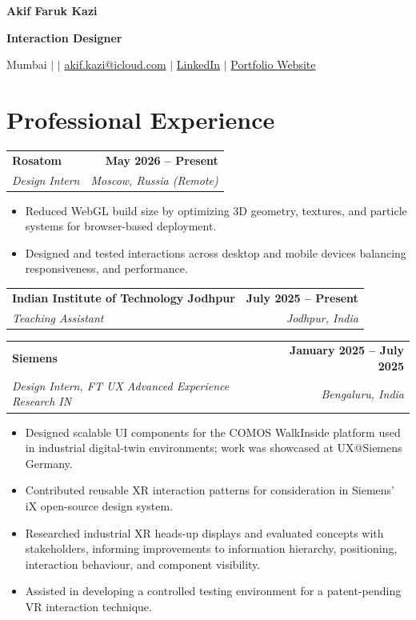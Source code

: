\documentclass[a4paper,10.5pt]{article}
\makeatletter
\newcommand{\resumeEntry}[4]{
    \begin{tabularx}{\textwidth}{@{}X r@{}}
        \textbf{\color{headingcolor}#1} & \textbf{#4} \\
        \textit{#3} & \textit{#2}
    \end{tabularx}
    \vspace{1pt}
}
\newcommand{\resumeListStart}{
    \begin{itemize}
}
\newcommand{\resumeListEnd}{
    \end{itemize}
    \vspace{3pt}
}
\makeatother
\begin{document}
\begin{center}
    {\LARGE\bfseries\color{headingcolor} Akif Faruk Kazi}

    \vspace{3pt}

    \textbf{Interaction Designer}

    \vspace{5pt}

    Mumbai
    \enspace $\vert$ 
    \enspace $\vert$ \enspace
    \href{mailto:akif.kazi@icloud.com}{akif.kazi@icloud.com}
    \enspace $\vert$ \enspace
    \href{https://www.linkedin.com/in/akif-faruk-kazi/}{LinkedIn}
    \enspace $\vert$ \enspace
    \href{https://akifkazi.notion.site/portfolio}{Portfolio Website}
\end{center}

\section{Professional Experience}

\resumeEntry
    {Rosatom}
    {Moscow, Russia (Remote)}
    {Design Intern}
    {May 2026 -- Present}

\resumeListStart
    \item Reduced WebGL build size by optimizing 3D geometry, textures, and particle systems for browser-based deployment.
    \item Designed and tested interactions across desktop and mobile devices balancing responsiveness, and performance.
\resumeListEnd

\resumeEntry
    {Indian Institute of Technology Jodhpur}
    {Jodhpur, India}
    {Teaching Assistant}
    {July 2025 -- Present}

\resumeListStart
\resumeListEnd

\resumeEntry
    {Siemens}
    {Bengaluru, India}
    {Design Intern, FT UX Advanced Experience Research IN}
    {January 2025 -- July 2025}

\resumeListStart
    \item Designed scalable UI components for the COMOS WalkInside platform used in industrial digital-twin environments; work was showcased at UX@Siemens Germany.
    \item Contributed reusable XR interaction patterns for consideration in Siemens' iX open-source design system.
    \item Researched industrial XR heads-up displays and evaluated concepts with stakeholders, informing improvements to information hierarchy, positioning, interaction behaviour, and component visibility.
    \item Assisted in developing a controlled testing environment for a patent-pending VR interaction technique.
\resumeListEnd
\end{document}
